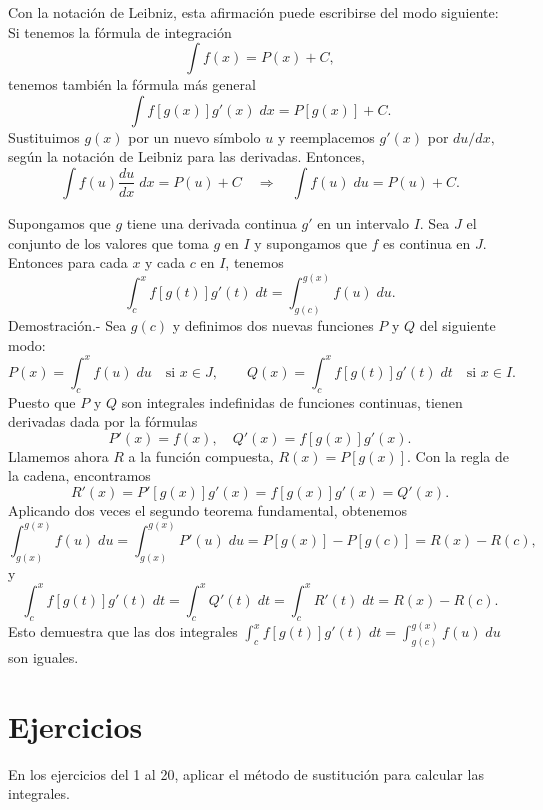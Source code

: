 Con la notación de Leibniz, esta afirmación puede escribirse del modo siguiente: Si tenemos la fórmula de integración
$$\int f(x)=P(x)+C,$$
tenemos también la fórmula más general
$$\int f[g(x)]g'(x)\; dx = P[g(x)]+C.$$
Sustituimos $g(x)$ por un nuevo símbolo $u$ y reemplacemos $g'(x)$ por $du/dx,$ según la notación de Leibniz para las derivadas. Entonces,
$$\int f(u) \dfrac{du}{dx}\; dx = P(u)+C \quad \Rightarrow \quad \int f(u)\; du = P(u)+C.$$

\begin{teo}
    Supongamos que $g$ tiene una derivada continua $g'$ en un intervalo $I$. Sea $J$ el conjunto de los valores que toma $g$ en $I$ y supongamos que $f$ es continua en $J$. Entonces para cada $x$ y cada $c$ en $I$, tenemos
    $$\int_c^x f[g(t)]g'(t)\; dt = \int_{g(c)}^{g(x)}f(u)\; du.$$
	Demostración.-\; Sea $g(c)$ y definimos dos nuevas funciones $P$ y $Q$ del siguiente modo:
	$$P(x)=\int_c^x f(u)\; du \quad \mbox{si } x\in J,\qquad Q(x)=\int_c^x f[g(t)]g'(t)\; dt\quad \mbox{si } x\in I.$$
	Puesto que $P$ y $Q$ son integrales indefinidas de funciones continuas, tienen derivadas dada por la fórmulas
	$$P'(x)=f(x),\quad Q'(x)=f[g(x)]g'(x).$$
	Llamemos ahora $R$ a la función compuesta, $R(x)=P[g(x)]$. Con la regla de la cadena, encontramos 
	$$R'(x)=P'[g(x)]g'(x)=f[g(x)]g'(x)=Q'(x).$$
	Aplicando dos veces el segundo teorema fundamental, obtenemos
	$$\int_{g(x)}^{g(x)} f(u)\; du = \int_{g(x)}^{g(x)} P'(u)\; du = P[g(x)]-P[g(c)]=R(x)-R(c),$$
	y
	$$\int_c^x f[g(t)]g'(t)\; dt = \int_c^x Q'(t)\; dt = \int_c^x R'(t)\; dt = R(x)-R(c).$$
	Esto demuestra que las dos integrales $\int_c^x f[g(t)]g'(t)\; dt = \int_{g(c)}^{g(x)}f(u)\; du$ son iguales.
\end{teo}

\section{Ejercicios}

En los ejercicios del 1 al 20, aplicar el método de sustitución para calcular las integrales.\\

